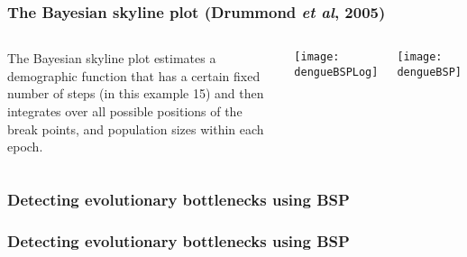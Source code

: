 %
%

\begin{frame}
\frametitle{The Bayesian skyline plot (Drummond {\it et al}, 2005)}

\begin{columns}


The Bayesian skyline plot estimates a demographic function that has a certain fixed number of steps (in this example 15) and then integrates over all possible positions of the break points, and population sizes within each epoch.


\texttt{[image: dengueBSPLog]}

\texttt{[image: dengueBSP]}

\end{columns}
\end{frame}




\begin{frame}
\frametitle{Detecting evolutionary bottlenecks using BSP}
\end{frame}

\begin{frame}
\frametitle{Detecting evolutionary bottlenecks using BSP}
\end{frame}

